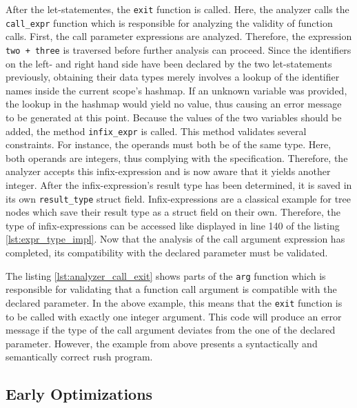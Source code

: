 After the let-statementes, the \texttt{exit} function is called.
Here, the analyzer calls the \texttt{call\_expr} function which is responsible for analyzing the validity of function calls.
First, the call parameter expressions are analyzed.
Therefore, the expression \texttt{two + three} is traversed before further analysis can proceed.
Since the identifiers on the left- and right hand side have been declared by the two let-statements previously,
obtaining their data types merely involves a lookup of the identifier names inside the current scope's hashmap.
If an unknown variable was provided, the lookup in the hashmap would yield no value, thus causing an error message to be generated at this point.
Because the values of the two variables should be added, the method \texttt{infix\_expr} is called.
This method validates several constraints.
For instance, the operands must both be of the same type.
Here, both operands are integers, thus complying with the specification.
Therefore, the analyzer accepts this infix-expression and is now aware that it yields another integer.
After the infix-expression's result type has been determined, it is saved in its own \texttt{result\_type} struct field.
Infix-expressions are a classical example for tree nodes which save their result type as a struct field on their own.
Therefore, the type of infix-expressions can be accessed like displayed in line 140 of the listing \ref{lst:expr_type_impl}.
Now that the analysis of the call argument expression has completed, its compatibility with the declared parameter must be validated.


The listing \ref{lst:analyzer_call_exit} shows parts of the \texttt{arg} function which is responsible for validating that a function call argument is compatible with the declared parameter.
In the above example, this means that the \texttt{exit} function is to be called with exactly one integer argument.
This code will produce an error message if the type of the call argument deviates from the one of the declared parameter.
However, the example from above presents a syntactically and semantically correct rush program.

\subsection{Early Optimizations}

